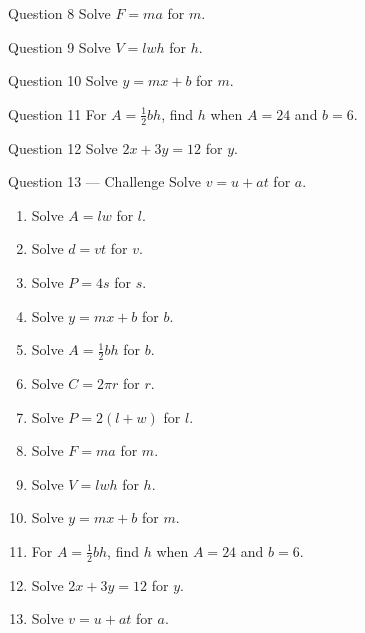 \documentclass[11pt]{article}
\begin{document}
\begin{qbox}{Question 8}
Solve $F=ma$ for $m$.\workspace{2.0cm}
\end{qbox}

\begin{qbox}{Question 9}
Solve $V=lwh$ for $h$.\workspace{2.0cm}
\end{qbox}

\begin{qbox}{Question 10}
Solve $y=mx+b$ for $m$.\workspace{2.0cm}
\end{qbox}

\begin{qbox}{Question 11}
For $A=\tfrac12 bh$, find $h$ when $A=24$ and $b=6$.\workspace{2.4cm}
\end{qbox}

\begin{qbox}{Question 12}
Solve $2x+3y=12$ for $y$.\workspace{2.2cm}
\end{qbox}

\begin{qbox}{Question 13 --- Challenge}
Solve $v=u+at$ for $a$.\workspace{2.4cm}
\end{qbox}

\clearpage
{}

\begin{recapbox}
\begin{multicols}{2}
\small
\begin{enumerate}[leftmargin=*,itemsep=3pt]
  \item Solve $A=lw$ for $l$.
  \item Solve $d=vt$ for $v$.
  \item Solve $P=4s$ for $s$.
  \item Solve $y=mx+b$ for $b$.
  \item Solve $A=\tfrac12 bh$ for $b$.
  \item Solve $C=2\pi r$ for $r$.
  \item Solve $P=2(l+w)$ for $l$.
  \item Solve $F=ma$ for $m$.
  \item Solve $V=lwh$ for $h$.
  \item Solve $y=mx+b$ for $m$.
  \item For $A=\tfrac12 bh$, find $h$ when $A=24$ and $b=6$.
  \item Solve $2x+3y=12$ for $y$.
  \item Solve $v=u+at$ for $a$.
\end{enumerate}
\end{multicols}
\end{recapbox}
\end{document}
